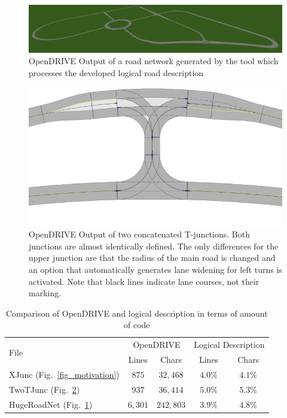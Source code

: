 \documentclass[a4paper, 10pt, conference]{ieeeconf}      %
\begin{document}
\begin{figure}[!th]
	\includegraphics[width=\textwidth]{fig/res_huge.PNG}
	\caption{OpenDRIVE Output of a road network generated by the tool which processes the developed logical road description}
	\label{fig_resHuge}
\end{figure} %
\begin{figure}
	\includegraphics[width=\columnwidth]{fig/res3_2.png}
	\caption{OpenDRIVE Output of two concatenated T-junctions. Both junctions are almost identically defined. The only differences for the upper junction are that the radius of the main road is changed and an option that automatically generates lane widening for left turns is activated. Note that black lines indicate lane courses, not their marking.}
	\label{fig_res3_2}
\end{figure}

\begin{table}
	\caption{Comparison of OpenDRIVE and logical description in terms of amount of code}
	\label{tab_comparison}
	\def\arraystretch{1.5}
	\begin{center}
		\begin{tabular}{l|cccc}
			\multirow{2}{*}{File} & \multicolumn{2}{c}{OpenDRIVE} & \multicolumn{2}{c}{Logical Description}\\
			& Lines & Chars & Lines & Chars \\
			\hline
			XJunc (Fig.~\ref{fig_motivation}) & $875$ & $32,468$& $4.0\%$ &$4.1\%$\\
			TwoTJunc (Fig.~\ref{fig_res3_2}) & $937$ & $36,414$& $5.0\%$ &$5.3\%$\\
			HugeRoadNet (Fig.~\ref{fig_resHuge}) & $6,301$ & $242,803$& $3.9\%$ &$4.8\%$
		\end{tabular}
	\end{center}
\end{table}
\end{document}
